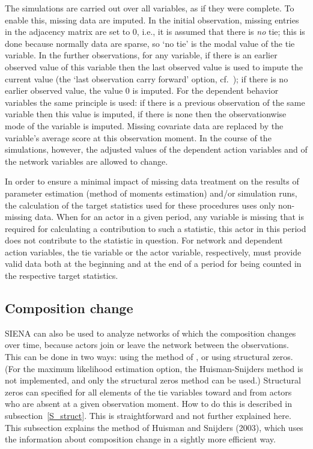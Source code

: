 \documentclass[a4paper,fleqn]{article}
\newcommand{\+}{\, + \,}
\newcommand{\SI}{{\sf SIENA }}
\begin{document}
{The simulations are carried out over all variables,
as if they were complete.
To enable this, missing data are imputed.
In the initial observation, missing entries in the adjacency
matrix are set to 0,
i.e., it is assumed that there is \emph{no} tie;
this is done because normally data are sparse, so `no tie'
is the modal value of the tie variable.
In the further observations, for any variable,
if there is an earlier observed value of this variable then
the last observed value is used to impute the current
value (the `last observation carry forward' option,
cf.\ \citet{Lepkowski89}); if there is no earlier observed
value, the value 0 is imputed.
For the dependent behavior variables the same principle
is used: if there is a previous observation of the same variable
then this value is imputed, if there is none then the
observationwise mode of the variable is imputed.
Missing covariate data are replaced by the
variable's average score at this observation moment. In the course
of the simulations, however, the adjusted values of the dependent
action variables and of the network variables are allowed to
change.

In order to ensure a minimal impact of missing data treatment on
the results of parameter estimation (method of moments estimation)
and/or simulation runs, the calculation of the target statistics
used for these procedures uses only non-missing data. When
for an actor in a given period, any variable is missing that is
required for calculating a contribution to such a statistic, this
actor in this period does not contribute to the statistic in
question. For network and dependent action variables, the tie variable
or the actor variable, respectively,
must provide valid data both at the beginning and at the end of a
period for being counted in the respective target statistics.

\begin{print}
\end{print}
\subsection{Composition change}
\label{S_comp}

\SI can also be used to analyze networks of which the composition
changes over time, because actors join or leave the network
between the observations.
This can be done in two ways: using the method of \citet{HuismanSnijders03},
or using structural zeros.
(For the maximum likelihood estimation option, the Huisman-Snijders method
is not implemented, and only the structural zeros method can be used.)
Structural zeros can specified for all elements of the tie variables
toward and from actors who are absent at a given observation moment.
How to do this is described in subsection~\ref{S_struct}.
This is straightforward and not further explained here.
This subsection explains the method of Huisman and Snijders
(2003), which uses the information about composition change
in a sightly more efficient way.

}
\end{document}
